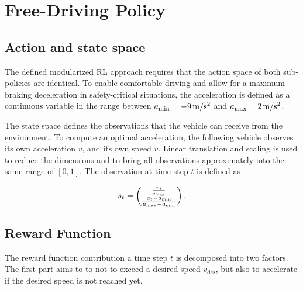 \documentclass[review]{elsarticle}
\providecommand{\green}[1]{\textcolor{green}{#1}}
\providecommand{\martinc}[1]{\green{[#1]}} %
\providecommand{\sub}[1]{_{\mathrm{#1}}}  %
\providecommand{\3}{{\ss}}
\begin{document}
  
  



\section{Free-Driving Policy}
\subsection{Action and state space}
\label{actionSpace1}
 The defined modularized RL approach requires that the action space of both sub-policies are identical. To enable comfortable driving and allow for a maximum braking deceleration in safety-critical
situations, the acceleration is defined as a continuous variable in the
  range between $a\sub{\rm min} = \unit[-9]{m/s^2}$ and $a\sub{\rm max} =\unit[2]{m/s^2}$.



The state space defines the observations that the 
vehicle can receive from the environment. To compute an optimal
acceleration, the following vehicle observes its own acceleration $\dot{v}$,
and its own speed $v$. Linear translation and scaling is used to
reduce the dimensions and to bring all observations approximately into
the same range of $[0,1]$. The observation at time step $t$ is defined
as 

\begin{equation}
s_t = \begin{pmatrix} \frac{v_t}{v\sub{des}} \\ \frac{a_t-a\sub{\rm min}}{a\sub{\rm max} - a\sub{\rm min}}\end{pmatrix}.
\end{equation}
\subsection{Reward Function}
\label{rewardFunction}
The reward function contribution a time step $t$ is decomposed into two factors. The first part aims to
to not to exceed a desired speed $v\sub{des}$, but also to accelerate if the desired speed is not reached yet.  
\end{document}
